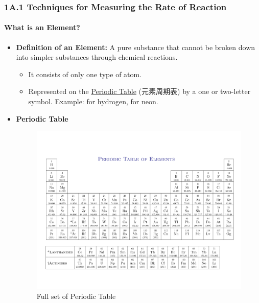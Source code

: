 
\subsubsection{1A.1 Techniques for Measuring the Rate of Reaction}
\paragraph{What is an Element?}
\begin{itemize}
    \item \textbf{Definition of an Element:} A pure substance that cannot be broken down into simpler substances through
    chemical reactions.
    \begin{itemize}
        \item It consists of only one type of atom.
        \item Represented on the \underline{Periodic Table} (元素周期表) by a one or two-letter symbol. Example:  for
        hydrogen,  for neon.
    \end{itemize}
    \item \textbf{Periodic Table}
    \begin{figure}[H]
        \centering
        \includegraphics[scale=0.05]{Chemistry/Images/periodic_table.png}
        \caption{Full set of Periodic Table}
    \end{figure}

\end{itemize}
